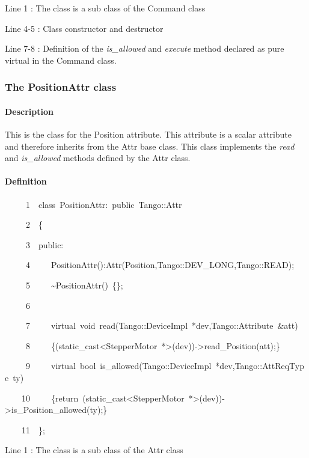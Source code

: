 Line 1 : The class is a sub class of the Command class

Line 4-5 : Class constructor and destructor

Line 7-8 : Definition of the \emph{is\_allowed} and \emph{execute}
method declared as pure virtual in the Command class.

\subsubsection{The PositionAttr class}

\paragraph{Description}

This is the class for the Position attribute. This attribute is a
scalar attribute and therefore inherits from the Attr base class.
This class implements the \emph{read} and \emph{is\_allowed}
methods defined by the Attr class.

\paragraph{Definition}


\begin{lyxcode}
~~~~~1~~class~PositionAttr:~public~Tango::Attr

~~~~~2~~\{

~~~~~3~~public:

~~~~~4~~~~~PositionAttr():Attr(\textquotedbl{}Position\textquotedbl{},Tango::DEV\_LONG,Tango::READ);

~~~~~5~~~~~\textasciitilde{}PositionAttr()~\{\};

~~~~~6~~~~~~~~~~

~~~~~7~~~~~virtual~void~read(Tango::DeviceImpl~{*}dev,Tango::Attribute~\&att)

~~~~~8~~~~~\{(static\_cast<StepperMotor~{*}>(dev))->read\_Position(att);\}

~~~~~9~~~~~virtual~bool~is\_allowed(Tango::DeviceImpl~{*}dev,Tango::AttReqType~ty)

~~~~10~~~~~\{return~(static\_cast<StepperMotor~{*}>(dev))->is\_Position\_allowed(ty);\}

~~~~11~~\};
\end{lyxcode}


Line 1 : The class is a sub class of the Attr class

